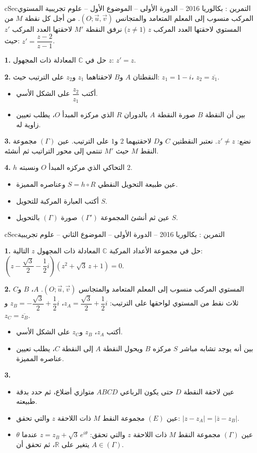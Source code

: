 \documentclass[12pt,a4paper]{article}
\newenvironment{BOX}[2]{\begin{otherlanguage}{english}\begin{arbox}{#1}{#2}}{\end{arbox}\end{otherlanguage}}
\newcounter{exo}
\newenvironment{tamrin}[1]{\stepcounter{exo}\begin{BOX}{cSec}{التمرين \theexo: #1}}{\end{BOX}}
\newenvironment{sq}{\begin{itemize}[leftmargin=2.4em,itemsep=3pt]}{\end{itemize}}
\newcommand{\qa}{\item[(أ)]}\newcommand{\qb}{\item[(ب)]}\newcommand{\qc}{\item[(جـ)]}\newcommand{\qd}{\item[(د)]}\newcommand{\qe}{\item[(هـ)]}
\newcommand{\QQ}[1]{\par\smallskip\textbf{#1.} }
\begin{document}
\begin{tamrin}{بكالوريا 2016 -- الدورة الأولى -- الموضوع الأول -- علوم تجريبية}
المستوي المركب منسوب إلى المعلم المتعامد والمتجانس $(O;\vec u,\vec v)$. من أجل كل نقطة $M$ من المستوي لاحقتها العدد المركب $z$ ($z\neq1$) نرفق النقطة $M'$ لاحقتها العدد المركب $z'$ حيث: $z'=\dfrac{z-2}{z-1}$.
\QQ{1} حل في $\mathbb{C}$ المعادلة ذات المجهول $z$: $z'=z$.
\QQ{2} النقطتان $A$ و$B$ لاحقتاهما $z_1$ و$z_2$ على الترتيب حيث: $z_1=1-i$، $z_2=\overline{z_1}$.
\begin{sq}
\qa أكتب $\dfrac{z_2}{z_1}$ على الشكل الأسي.
\qb بين أن النقطة $B$ صورة النقطة $A$ بالدوران $R$ الذي مركزه المبدأ $O$، يطلب تعيين زاوية له.
\end{sq}
\QQ{3} نضع: $z'\neq z$. نعتبر النقطتين $C$ و$D$ لاحقتيهما $2$ و$1$ على الترتيب.
عين $(\Gamma)$ مجموعة النقط $M$ حيث $M'$ تنتمي إلى محور التراتيب ثم أنشئه.
\QQ{4} $h$ التحاكي الذي مركزه المبدأ $O$ ونسبته $2$.
\begin{sq}
\qa عين طبيعة التحويل النقطي $S=h\circ R$ وعناصره المميزة.
\qb أكتب العبارة المركبة للتحويل $S$.
\qc عين ثم أنشئ المجموعة $(\Gamma')$ صورة $(\Gamma)$ بالتحويل $S$.
\end{sq}
\end{tamrin}

\begin{tamrin}{بكالوريا 2016 -- الدورة الأولى -- الموضوع الثاني -- علوم تجريبية}
\QQ{1} حل في مجموعة الأعداد المركبة $\mathbb{C}$ المعادلة ذات المجهول $z$ التالية: $\left(z-\dfrac{\sqrt3}{2}-\dfrac12i\right)\left(z^2+\sqrt3\,z+1\right)=0$.
\QQ{2} المستوي المركب منسوب إلى المعلم المتعامد والمتجانس $(O;\vec u,\vec v)$.
$A$، $B$ و$C$ ثلاث نقط من المستوي لواحقها على الترتيب: $z_A=\dfrac{\sqrt3}{2}+\dfrac12i$، $z_B=-\dfrac{\sqrt3}{2}+\dfrac12i$ و$z_C=\overline{z_B}$.
\begin{sq}
\qa أكتب $z_A$، $z_B$ و$z_C$ على الشكل الأسي.
\qb بين أنه يوجد تشابه مباشر $S$ مركزه $B$ ويحول النقطة $A$ إلى النقطة $C$، يطلب تعيين عناصره المميزة.
\end{sq}
\QQ{3}
\begin{sq}
\qa عين لاحقة النقطة $D$ حتى يكون الرباعي $ABCD$ متوازي أضلاع، ثم حدد بدقة طبيعته.
\qb عين $(E)$ مجموعة النقط $M$ ذات اللاحقة $z$ والتي تحقق: $|z-z_A|=\left|\overline{z}-z_B\right|$.
\qc عين $(\Gamma)$ مجموعة النقط $M$ ذات اللاحقة $z$ والتي تحقق: $z=z_B+\sqrt3\,e^{i\theta}$ عندما $\theta$ يتغير على $\mathbb{R}$، ثم تحقق أن $A\in(\Gamma)$.
\end{sq}
\end{tamrin}
\end{document}
